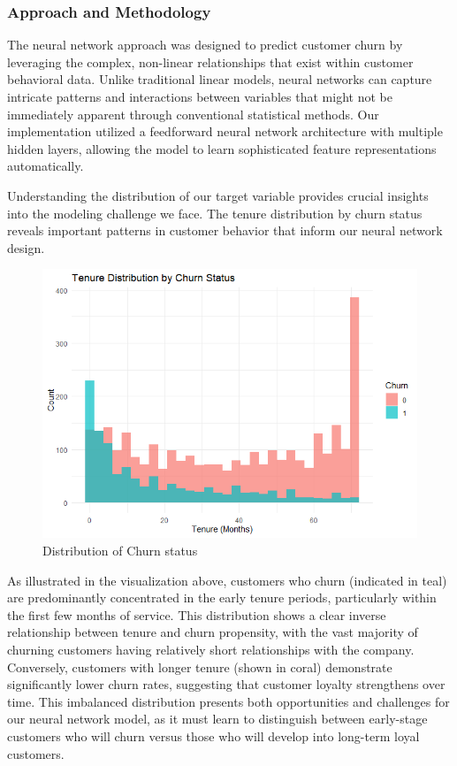 \documentclass[
]{article}
\begin{document}
\hypertarget{approach-and-methodology}{%
\subsubsection{Approach and
Methodology}\label{approach-and-methodology}}

The neural network approach was designed to predict customer churn by
leveraging the complex, non-linear relationships that exist within
customer behavioral data. Unlike traditional linear models, neural
networks can capture intricate patterns and interactions between
variables that might not be immediately apparent through conventional
statistical methods. Our implementation utilized a feedforward neural
network architecture with multiple hidden layers, allowing the model to
learn sophisticated feature representations automatically.

Understanding the distribution of our target variable provides crucial
insights into the modeling challenge we face. The tenure distribution by
churn status reveals important patterns in customer behavior that inform
our neural network design.

\begin{figure}

{\centering \includegraphics[width=0.85\linewidth]{Plots/distributionchurnstatus} 

}

\caption{Distribution of Churn status}\label{fig:distribution-status-plot}
\end{figure}

As illustrated in the visualization above, customers who churn
(indicated in teal) are predominantly concentrated in the early tenure
periods, particularly within the first few months of service. This
distribution shows a clear inverse relationship between tenure and churn
propensity, with the vast majority of churning customers having
relatively short relationships with the company. Conversely, customers
with longer tenure (shown in coral) demonstrate significantly lower
churn rates, suggesting that customer loyalty strengthens over time.
This imbalanced distribution presents both opportunities and challenges
for our neural network model, as it must learn to distinguish between
early-stage customers who will churn versus those who will develop into
long-term loyal customers.
\end{document}
